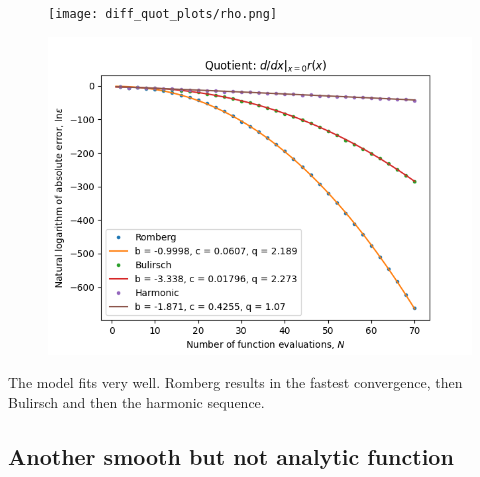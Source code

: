 \begin{figure}[H]
\centering
\begin{minipage}{0.45\textwidth}
\centering
\texttt{[image: diff\_quot\_plots/rho.png]}
\end{minipage}
\begin{minipage}{0.45\textwidth}
\centering
\includegraphics[scale=0.45]{diff_quot_plots/rho_hp_trend.png}
\end{minipage}
\end{figure}

The model fits very well. Romberg results in the fastest convergence, then Bulirsch and then the harmonic sequence.

\subsection{Another smooth but not analytic function}

